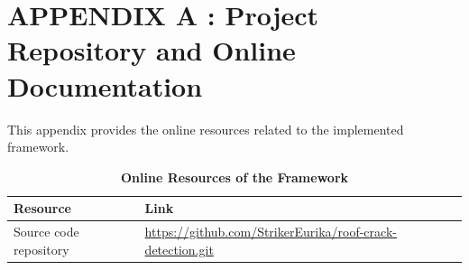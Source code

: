 \section*{APPENDIX A : Project Repository and Online Documentation}
\label{app:project_repository_documentation}

This appendix provides the online resources related to the implemented \findcrack{} framework.

\begin{table}[H]
      \centering
      \captionsetup{list=false}
      \caption*{\textbf{Online Resources of the Framework}}
      \renewcommand{\arraystretch}{1.2}

      \begin{tabularx}{\textwidth}{
            >{\raggedright\arraybackslash}p{4cm}
            >{\raggedright\arraybackslash}X
      }
            \toprule
            \textbf{Resource} & \textbf{Link} \\
            \midrule
            Source code repository &
            \url{https://github.com/StrikerEurika/roof-crack-detection.git} \\

            \bottomrule
      \end{tabularx}
\end{table}